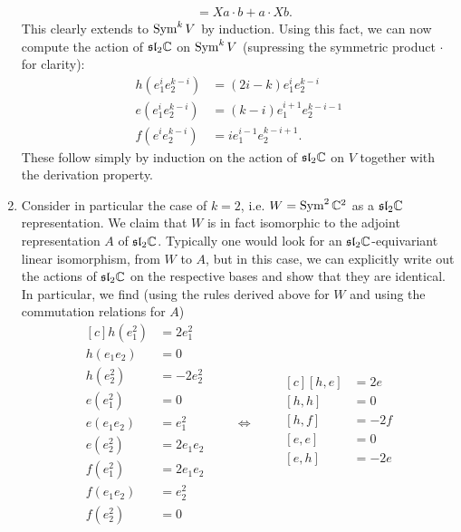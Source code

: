 \documentclass{../../mathnotes}
\begin{document}
\begin{enumerate}
\begin{align*}
            &=Xa\cdot b+a\cdot Xb.
        \end{align*}
        This clearly extends to $\operatorname{Sym}^kV$ by induction. Using this fact, we can now compute the action of $\mathfrak{sl}_2\mathbb{C}$ on $\operatorname{Sym}^kV$ (supressing
        the symmetric product $\cdot$ for clarity):
        \begin{align*}
            h(e_1^ie_2^{k-i})&=(2i-k)e_1^ie_2^{k-i}\\
            e(e_1^ie_2^{k-i})&=(k-i)e_1^{i+1}e_2^{k-i-1}\\
            f(e^ie_2^{k-i})&=ie_1^{i-1}e_2^{k-i+1}.
        \end{align*}
        These follow simply by induction on the action of $\mathfrak{sl}_2\mathbb{C}$ on $V$ together with the derivation property.
    \item Consider in particular the case of $k=2$, i.e. $W=\operatorname{Sym}^2\mathbb{C}^2$ as a $\mathfrak{sl}_2\mathbb{C}$ representation. We claim that $W$ is in fact
        isomorphic to the adjoint representation $A$ of $\mathfrak{sl}_2\mathbb{C}$. Typically one would look for an $\mathfrak{sl}_2\mathbb{C}$-equivariant linear isomorphism,
        from $W$ to $A$, but in this case, we can explicitly write out the actions of $\mathfrak{sl}_2\mathbb{C}$ on the respective bases and show that they
        are identical. In particular, we find (using the rules derived above for $W$ and using the commutation relations for $A$)
        \begin{equation*}
            \begin{aligned}[c]
                h(e_1^2)&=2e_1^2\\
                h(e_1e_2)&=0\\
                h(e_2^2)&=-2e_2^2\\
                e(e_1^2)&=0\\
                e(e_1e_2)&=e_1^2\\
                e(e_2^2)&=2e_1e_2\\
                f(e_1^2)&=2e_1e_2\\
                f(e_1e_2)&=e_2^2\\
                f(e_2^2)&=0
            \end{aligned}
            \qquad\Longleftrightarrow\qquad
            \begin{aligned}[c]
                [h,e]&=2e\\
                [h,h]&=0\\
                [h,f]&=-2f\\
                [e,e]&=0\\
                [e,h]&=-2e\\

\end{aligned}
\end{equation*}
\end{enumerate}
\end{document}
